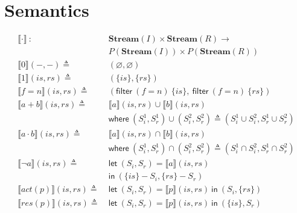 \documentclass[12pt, letterpaper]{article}
\let\emptyset\varnothing
\newcommand\interp[1]{\llbracket #1 \rrbracket}
\begin{document}
\section{Semantics}
  \begin{align*}
    \interp{ \cdot }\ 
      :\ \ &
      \mathbf{Stream}(I)\times \mathbf{Stream}(R) \rightarrow \\
      & P(\mathbf{Stream}(I))\times P(\mathbf{Stream}(R)) 
      \\
    \interp{ 0 }(-, -)
      \triangleq\ &
      (\emptyset , \emptyset)
      \\ %
    \interp{ 1 }(\mathit{is}, \mathit{rs})
      \triangleq\ &
      (\{\mathit{is}\},\{\mathit{rs}\})
      \\
    \interp{ f=n }(\mathit{is}, \mathit{rs})
      \triangleq\ &
      (\mathsf{filter}\ (f=n)\ \{\mathit{is}\},\
       \mathsf{filter}\ (f=n)\ \{\mathit{rs}\}) 
      \\
    \interp{ a + b }(\mathit{is}, \mathit{rs})
      \triangleq\ &
      \interp { a }(\mathit{is}, \mathit{rs})\cup
      \interp { b }(\mathit{is}, \mathit{rs}) \\
      &\mathsf{where}\ (S_i^1, S_r^1)\cup (S_i^2, S_r^2)\triangleq
        (S_i^1\cup S_i^2, S_r^1\cup S_r^2)\\
    \interp { a \cdot b }(\mathit{is}, \mathit{rs})
      \triangleq\ &
      \interp { a }(\mathit{is}, \mathit{rs})\cap
      \interp { b }(\mathit{is}, \mathit{rs}) \\
      &\mathsf{where}\ (S_i^1, S_r^1)\cap (S_i^2, S_r^2)\triangleq
        (S_i^1\cap S_i^2, S_r^1\cap S_r^2)\\
    \interp { \neg a }(\mathit{is}, \mathit{rs})
      \triangleq\ &
      \mathsf{let}\ (S_i, S_r) = \interp {a}(\mathit{is}, \mathit{rs}) \\
      &\mathsf{in}\ (\{\mathit{is}\} - S_i, \{\mathit{rs}\} - S_r)
      \\
    \interp { act(p) }(\mathit{is}, \mathit{rs})
      \triangleq\ &
      \mathsf{let}\ (S_i,S_r) = \interp {p}(\mathit{is}, \mathit{rs})\ 
      \mathsf{in}\ (S_i, \{\mathit{rs}\})
      \\
    \interp { res(p) }(\mathit{is}, \mathit{rs})
      \triangleq\ &
      \mathsf{let}\ (S_i,S_r) = \interp {p}(\mathit{is}, \mathit{rs})\ 
      \mathsf{in}\ (\{\mathit{is}\}, S_r)

\end{align*}
\end{document}
